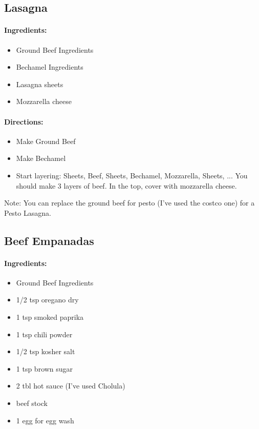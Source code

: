 \documentclass{article}
\begin{document}
\subsection{Lasagna}

\paragraph{Ingredients:}

\begin{itemize}
  \item Ground Beef Ingredients
  \item Bechamel Ingredients
  \item Lasagna sheets
  \item Mozzarella cheese
\end{itemize}

\paragraph{Directions:}
\begin{itemize}
  \item Make Ground Beef
  \item Make Bechamel
  \item Start layering: Sheets, Beef, Sheets, Bechamel, Mozzarella, Sheets, ... You should make 3 layers of beef. In the top, cover with mozzarella cheese.
\end{itemize}

Note: You can replace the ground beef for pesto (I’ve used the costco one) for a Pesto Lasagna.

\subsection{Beef Empanadas}
\paragraph{Ingredients:}
\begin{itemize}
  \item Ground Beef Ingredients
  \item 1/2 tsp oregano dry
  \item 1 tsp smoked paprika
  \item 1 tsp chili powder
  \item 1/2 tsp kosher salt
  \item 1 tsp brown sugar
  \item 2 tbl hot sauce (I’ve used Cholula)
  \item beef stock
  \item 1 egg for egg wash
\end{itemize}
\end{document}
